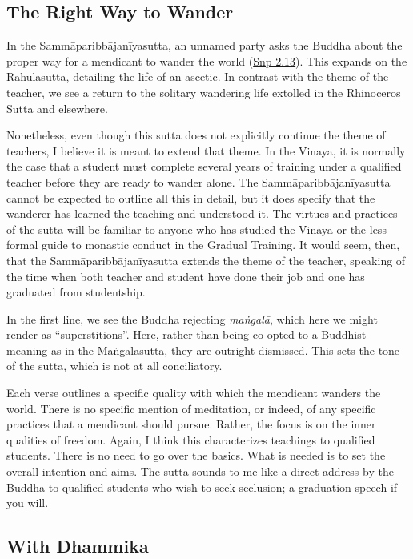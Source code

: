 \documentclass[12pt,openany]{book}%
\begin{document}
\subsection*{The Right Way to Wander}

In the \textsanskrit{Sammāparibbājanīyasutta}, an unnamed party asks the Buddha about the proper way for a mendicant to wander the world (\href{https://suttacentral.net/snp2.13/en/sujato}{Snp 2.13}). This expands on the \textsanskrit{Rāhulasutta}, detailing the life of an ascetic. In contrast with the theme of the teacher, we see a return to the solitary wandering life extolled in the Rhinoceros Sutta and elsewhere.

Nonetheless, even though this sutta does not explicitly continue the theme of teachers, I believe it is meant to extend that theme. In the Vinaya, it is normally the case that a student must complete several years of training under a qualified teacher before they are ready to wander alone. The \textsanskrit{Sammāparibbājanīyasutta} cannot be expected to outline all this in detail, but it does specify that the wanderer has learned the teaching and understood it. The virtues and practices of the sutta will be familiar to anyone who has studied the Vinaya or the less formal guide to monastic conduct in the Gradual Training. It would seem, then, that the \textsanskrit{Sammāparibbājanīyasutta} extends the theme of the teacher, speaking of the time when both teacher and student have done their job and one has graduated from studentship.

In the first line, we see the Buddha rejecting \textit{\textsanskrit{maṅgalā}}, which here we might render as “superstitions”. Here, rather than being co-opted to a Buddhist meaning as in the \textsanskrit{Maṅgalasutta}, they are outright dismissed. This sets the tone of the sutta, which is not at all conciliatory.

Each verse outlines a specific quality with which the mendicant wanders the world. There is no specific mention of meditation, or indeed, of any specific practices that a mendicant should pursue. Rather, the focus is on the inner qualities of freedom. Again, I think this characterizes teachings to qualified students. There is no need to go over the basics. What is needed is to set the overall intention and aims. The sutta sounds to me like a direct address by the Buddha to qualified students who wish to seek seclusion; a graduation speech if you will.

\subsection*{With Dhammika}
\end{document}
